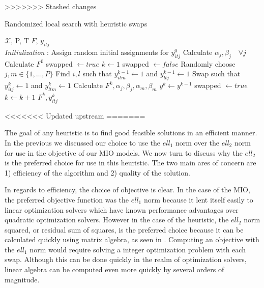 >>>>>>> Stashed changes
\begin{algorithm}
 \caption{Randomized local search with heuristic swaps}
 \label{alg:Basic_Heuristic}
 \begin{algorithmic}[1]
  \renewcommand{\algorithmicrequire}{\textbf{Input:}}
  \renewcommand{\algorithmicensure}{\textbf{Output:}}
 \REQUIRE $\boldsymbol{\mathcal{X}}$, P, T
 \ENSURE  $F$, $y_{itj}$
 \\ \textit{Initialization} : Assign random initial assignments for $y^{0}_{itj}$
  \STATE Calculate $\alpha_{j}, \beta_{j} \quad \forall j $
  \STATE Calculate $F^{0}$
  \STATE swapped $\leftarrow true$
  \STATE $k\leftarrow1$
  \STATE swapped $\leftarrow false$
  \STATE Randomly choose $j,m\in\{1,\ldots,P\}$
  \STATE Find $i,l$ such that $y^{k-1}_{itm}\leftarrow1$ and $y^{k-1}_{ltj}\leftarrow1$
  \STATE Swap such that $y^{k}_{itj}\leftarrow1$ and $y^{k}_{ltm}\leftarrow1$
  \STATE Calculate $F^{k}, \alpha_{j}, \beta_{j}, \alpha_{m}, \beta_{m}$
  \STATE $y^{k} \leftarrow y^{k-1}$
  \ELSE 
  \STATE swapped $\leftarrow true$
  \ENDIF
  \ENDFOR
  \STATE $ k \leftarrow k + 1 $
  \ENDWHILE
 \RETURN $F^{k}, y^{k}_{itj}$ 
 \end{algorithmic} 
 \end{algorithm}
<<<<<<< Updated upstream
=======

The goal of any heuristic is to find good feasible solutions in an efficient manner. In the previous \mysection we discussed our choice to use the $ell_1$ norm over the $ell_2$ norm for use in the objective of our MIO models. We now turn to discuss why the $ell_2$ is the preferred choice for use in this heuristic. The two main ares of concern are 1) efficiency of the algorithm and 2) quality of the solution.

In regards to efficiency, the choice of objective is clear. In the case of the MIO, the preferred objective function was the  $ell_1$ norm because it lent itself easily to linear optimization solvers which have known performance advantages over quadratic optimization solvers. However in the case of the heuristic, the $ell_2$ norm squared, or residual sum of squares, is the preferred choice because it can be calculated quickly using matrix algebra, as seen in  \cite{RSS-Matrix}. Computing an objective with the $ell_1$ norm would require solving a integer optimization problem with each swap. Although this can be done quickly in the realm of optimization solvers, linear algebra can be computed even more quickly by several orders of magnitude. 

